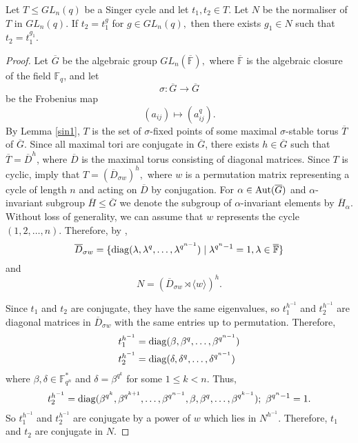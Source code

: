 \begin{Lem}\label{sin}
Let $T \le GL_n(q)$ be a Singer cycle and let $t_1, t_2 \in T$. Let $N$ be the normaliser of $T$ in $GL_n(q).$
If $t_2 =t_1^g$ for $g \in GL_n(q),$ then there exists $g_1 \in N$ such that $t_2=t_1^{g_1}.$
\end{Lem}
\begin{proof}
Let $\overline{G}$ be the algebraic group $GL_n( \overline{\mathbb{F}}),$ where $\overline{\mathbb{F}}$ is the algebraic closure of the field $\mathbb{F}_q$, and let $$\sigma : \overline{G} \to \overline{G}$$
be the Frobenius map $$ (a_{ij}) \mapsto (a_{ij}^q).$$
 By Lemma \ref{sin1}, $T$ is the set  of $\sigma$-fixed points of some maximal $\sigma$-stable torus $\overline{T} $ of  $\overline{G}.$ 
Since all maximal tori are conjugate in $\overline{G}$, there exists $h \in \overline{G}$ such that $\overline{T}=\overline{D}^h$, where $\overline{D}$ is the maximal torus consisting of diagonal matrices. Since $T$ is cyclic,  \cite[Lemma 1.2 and Proposition 2.1]{buturl} imply that  $T=(\overline{D}_{\sigma w})^{h},$ where $w$ is a permutation matrix representing a cycle of length $n$ and acting on $\overline{D}$ by conjugation. For $\alpha \in \mathrm{Aut}(\overline{G})$ and $\alpha$-invariant subgroup $\overline{H} \le \overline{G}$   we denote the subgroup of $\alpha$-invariant elements by $\overline{H}_{\alpha}.$ Without loss of generality, we can assume that $w$ represents the cycle $(1, 2, \ldots, n).$ Therefore, by \cite[Lemma 1.3]{buturl},
\begin{equation}\label{sopr1}
\overline{D}_{\sigma w}= \{\mathrm{diag}(\lambda, \lambda^q, \ldots, \lambda^{q^{n-1}}) \mid \lambda^{q^n-1} = 1, \lambda \in \overline{\mathbb{F}}\}  
\end{equation}
and
\begin{equation*}%
N=(\overline{D}_{\sigma w} \rtimes \langle w \rangle)^h.
\end{equation*}

Since $t_1$ and $t_2$ are conjugate, they have the same eigenvalues, so $t_1^{h^{-1}}$ and $t_2^{h^{-1}}$ are diagonal matrices in $\overline{D}_{\sigma w}$ with the same entries up to permutation. Therefore,
\begin{align*}t_1^{h^{-1}} & = \mathrm{diag}(\beta, \beta^q, \ldots, \beta^{q^{n-1}})\\
t_2^{h^{-1}} &  =  \mathrm{diag}(\delta, \delta^q, \ldots, \delta^{q^{n-1}})
\end{align*}
where $\beta, \delta \in \mathbb{F}_{q^n}^*$ and $\delta = \beta^{q^k}$ for some $1\le k<n.$ Thus, 
$$t_2^{h^{-1}}=\mathrm{diag}( \beta^{q^{k}}, \beta^{q^{k+1}}, \ldots, \beta^{q^{n-1}}, \beta, \beta^{q}, \ldots, \beta^{q^{k-1}}  ); \text{  } \beta^{q^n-1} = 1.$$
So $t_1^{h^{-1}}$ and $t_2^{h^{-1}}$ are conjugate by a power of $w$ which lies in $N^{h^{-1}}$. Therefore, $t_1$ and $t_2$ are conjugate in $N$. 
\end{proof}


